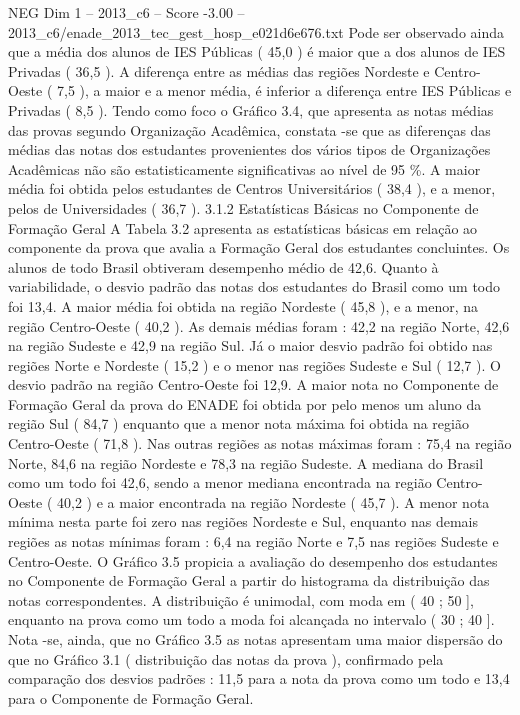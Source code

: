 \begin{textsample}{NEG Dim 1 – 2013\_c6 – Score -3.00 – 2013\_c6/enade\_2013\_tec\_gest\_hosp\_e021d6e676.txt}
Pode ser observado ainda que a média dos alunos de IES Públicas ( 45,0 ) é maior que a dos alunos de IES Privadas ( 36,5 ).
A diferença entre as médias das regiões Nordeste e Centro-Oeste ( 7,5 ), a maior e a menor média, é inferior a diferença entre IES Públicas e Privadas ( 8,5 ).
Tendo como foco o Gráfico 3.4, que apresenta as notas médias das provas segundo Organização Acadêmica, constata -se que as diferenças das médias das notas dos estudantes provenientes dos vários tipos de Organizações Acadêmicas não são estatisticamente significativas ao nível de 95 \%.
A maior média foi obtida pelos estudantes de Centros Universitários ( 38,4 ), e a menor, pelos de Universidades ( 36,7 ). 3.1.2 Estatísticas Básicas no Componente de Formação Geral A Tabela 3.2 apresenta as estatísticas básicas em relação ao componente da prova que avalia a Formação Geral dos estudantes concluintes.
Os alunos de todo Brasil obtiveram desempenho médio de 42,6.
Quanto à variabilidade, o desvio padrão das notas dos estudantes do Brasil como um todo foi 13,4.
A maior média foi obtida na região Nordeste ( 45,8 ), e a menor, na região Centro-Oeste ( 40,2 ).
As demais médias foram : 42,2 na região Norte, 42,6 na região Sudeste e 42,9 na região Sul.
Já o maior desvio padrão foi obtido nas regiões Norte e Nordeste ( 15,2 ) e o menor nas regiões Sudeste e Sul ( 12,7 ).
O desvio padrão na região Centro-Oeste foi 12,9.
A maior nota no Componente de Formação Geral da prova do ENADE foi obtida por pelo menos um aluno da região Sul ( 84,7 ) enquanto que a menor nota máxima foi obtida na região Centro-Oeste ( 71,8 ).
Nas outras regiões as notas máximas foram : 75,4 na região Norte, 84,6 na região Nordeste e 78,3 na região Sudeste.
A mediana do Brasil como um todo foi 42,6, sendo a menor mediana encontrada na região Centro-Oeste ( 40,2 ) e a maior encontrada na região Nordeste ( 45,7 ).
A menor nota mínima nesta parte foi zero nas regiões Nordeste e Sul, enquanto nas demais regiões as notas mínimas foram : 6,4 na região Norte e 7,5 nas regiões Sudeste e Centro-Oeste.
O Gráfico 3.5 propicia a avaliação do desempenho dos estudantes no Componente de Formação Geral a partir do histograma da distribuição das notas correspondentes.
A distribuição é unimodal, com moda em ( 40 ; 50 ], enquanto na prova como um todo a moda foi alcançada no intervalo ( 30 ; 40 ].
Nota -se, ainda, que no Gráfico 3.5 as notas apresentam uma maior dispersão do que no Gráfico 3.1 ( distribuição das notas da prova ), confirmado pela comparação dos desvios padrões : 11,5 para a nota da prova como um todo e 13,4 para o Componente de Formação Geral.

\end{textsample}
